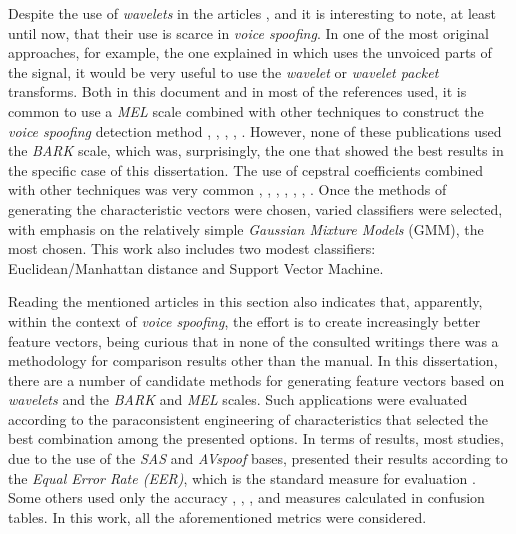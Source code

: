 	\par Despite the use of \textit{wavelets} in the articles \cite{DiqunYan2019}, \cite{Patel2015} and \cite{7802552} it is interesting to note, at least until now, that their use is scarce in \textit{voice spoofing}. In one of the most original approaches, for example, the one explained in \cite{ISI:000490497200068} which uses the unvoiced parts of the signal, it would be very useful to use the \textit{wavelet} or \textit{wavelet packet} transforms. Both in this document and in most of the references used, it is common to use a \textit{MEL} scale combined with other techniques to construct the \textit{voice spoofing} detection method \cite{Hanilci2018}, \cite{Patel2015} , \cite{8396208}, \cite{8725688}, \cite{ISI:000490497200068}. However, none of these publications used the \textit{BARK} scale, which was, surprisingly, the one that showed the best results in the specific case of this dissertation. The use of cepstral coefficients combined with other techniques was very common \cite{alluri2019replay}, \cite{7802552}, \cite{8725688}, \cite{Hanilci2018}, \cite{TODISCO2017516}, \cite{Patel2015}, \cite{ISI:000392503100008}. Once the methods of generating the characteristic vectors were chosen, varied classifiers were selected, with emphasis on the relatively simple \textit{Gaussian Mixture Models} (GMM), the most chosen. This work also includes two modest classifiers: Euclidean/Manhattan distance and Support Vector Machine.

	\par Reading the mentioned articles in this section also indicates that, apparently, within the context of \textit{voice spoofing}, the effort is to create increasingly better feature vectors, being curious that in none of the consulted writings there was a methodology for comparison results other than the manual. In this dissertation, there are a number of candidate methods for generating feature vectors based on \textit{wavelets} and the \textit{BARK} and \textit{MEL} scales. Such applications were evaluated according to the paraconsistent engineering of characteristics that selected the best combination among the presented options. In terms of results, most studies, due to the use of the \textit{SAS} \cite{SAS2015} \cite{SAS2017} \cite{SAS2019}  and \textit{AVspoof} \cite{AVspoof2015} bases, presented their results according to the \textit {Equal Error Rate (EER)}, which is the standard measure for evaluation . Some others used only the accuracy \cite{8396208}, \cite{ISI:000473343500086}, \cite{DiqunYan2019}, \cite{Ren2019} and measures calculated in confusion tables. In this work, all the aforementioned metrics were considered.	
